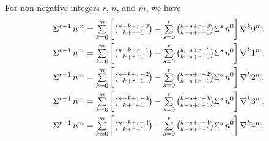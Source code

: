 \begin{example}
  For non-negative integers $r$, $n$, and $m$, we have
  \begin{align*}
    \Sigma^{r+1}\,{n}^{m}
    &=
    \mathop{\textstyle\sum}_{k=0}^{m}
    \left[
      \tbinom{n+k+r-0}{k+r+1}
      -
      \mathop{\textstyle\sum}_{s=0}^{r}
      \tbinom{k-s+r-0}{k-s+r+1} \Sigma^{s}\,{n}^{0}
    \right] \nabla^{k} 0^{m},
    \\
    \Sigma^{r+1}\,{n}^{m}
    &=
    \mathop{\textstyle\sum}_{k=0}^{m}
    \left[
      \tbinom{n+k+r-1}{k+r+1}
      -
      \mathop{\textstyle\sum}_{s=0}^{r}
      \tbinom{k-s+r-1}{k-s+r+1} \Sigma^{s}\,{n}^{0}
    \right] \nabla^{k} 1^{m},
    \\
    \Sigma^{r+1}\,{n}^{m}
    &=
    \mathop{\textstyle\sum}_{k=0}^{m}
    \left[
      \tbinom{n+k+r-2}{k+r+1}
      -
      \mathop{\textstyle\sum}_{s=0}^{r}
      \tbinom{k-s+r-2}{k-s+r+1} \Sigma^{s}\,{n}^{0}
    \right] \nabla^{k} 2^{m},
    \\
    \Sigma^{r+1}\,{n}^{m}
    &=
    \mathop{\textstyle\sum}_{k=0}^{m}
    \left[
      \tbinom{n+k+r-3}{k+r+1}
      -
      \mathop{\textstyle\sum}_{s=0}^{r}
      \tbinom{k-s+r-3}{k-s+r+1} \Sigma^{s}\,{n}^{0}
    \right] \nabla^{k} 3^{m},
    \\
    \Sigma^{r+1}\,{n}^{m}
    &=
    \mathop{\textstyle\sum}_{k=0}^{m}
    \left[
      \tbinom{n+k+r-4}{k+r+1}
      -
      \mathop{\textstyle\sum}_{s=0}^{r}
      \tbinom{k-s+r-4}{k-s+r+1} \Sigma^{s}\,{n}^{0}
    \right] \nabla^{k} 4^{m}.
  \end{align*}
\end{example}
